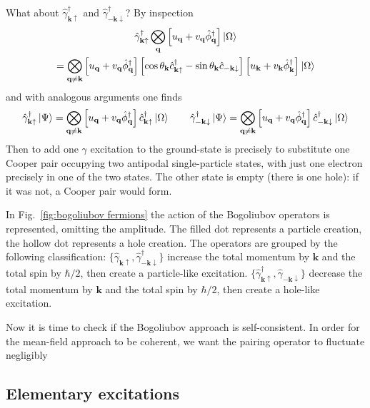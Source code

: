 What about $\hat{\gamma}_{\mathbf{k}\uparrow}^\dagger$ and $\hat{\gamma}_{-\mathbf{k}\downarrow}^\dagger$? By inspection
\begin{multline*}
	\hat{\gamma}_{\mathbf{k}\uparrow}^\dagger \bigotimes_\mathbf{q} \left[{u_\mathbf{q} + v_\mathbf{q} \hat{\phi}_\mathbf{q}^\dagger}\right] \ket{\Omega} \\ = \bigotimes_{\mathbf{q}\neq\mathbf{k}} \left[{u_\mathbf{q} + v_\mathbf{q} \hat{\phi}_\mathbf{q}^\dagger}\right] \left[{\cos\theta_\mathbf{k} \hat{c}_{\mathbf{k}\uparrow}^\dagger - \sin\theta_\mathbf{k} \hat{c}_{-\mathbf{k}\downarrow}}\right] \left[{u_\mathbf{k} + v_\mathbf{k} \hat{\phi}_\mathbf{k}^\dagger}\right] \ket{\Omega}
\end{multline*}
and with analogous arguments one finds
\[
	\hat{\gamma}_{\mathbf{k}\uparrow}^\dagger \ket{\Psi} = \bigotimes_{\mathbf{q}\neq\mathbf{k}} \left[{u_\mathbf{q} + v_\mathbf{q} \hat{\phi}_\mathbf{q}^\dagger}\right] \hat{c}_{\mathbf{k}\uparrow}^\dagger \ket{\Omega}
	\qquad
	\hat{\gamma}_{-\mathbf{k}\downarrow}^\dagger \ket{\Psi} = \bigotimes_{\mathbf{q}\neq\mathbf{k}} \left[{u_\mathbf{q} + v_\mathbf{q} \hat{\phi}_\mathbf{q}^\dagger}\right] \hat{c}_{-\mathbf{k}\downarrow}^\dagger \ket{\Omega}
\]
Then to add one $\gamma$ excitation to the ground-state is precisely to substitute one Cooper pair occupying two antipodal single-particle states, with just one electron precisely in one of the two states. The other state is empty (there is one hole): if it was not, a Cooper pair would form.

In Fig.~\ref{fig:bogoliubov fermions} the action of the Bogoliubov operators is represented, omitting the amplitude. The filled dot represents a particle creation, the hollow dot represents a hole creation. The operators are grouped by the following classification: $\lbrace \hat{\gamma}_{\mathbf{k}\uparrow}, \hat{\gamma}_{-\mathbf{k}\downarrow}^\dagger \rbrace$ increase the total momentum by $\mathbf{k}$ and the total spin by $\hbar/2$, then create a particle-like excitation. $\lbrace \hat{\gamma}_{\mathbf{k}\uparrow}^\dagger, \hat{\gamma}_{-\mathbf{k}\downarrow} \rbrace$ decrease the total momentum by $\mathbf{k}$ and the total spin by $\hbar/2$, then create a hole-like excitation. 

Now it is time to check if the Bogoliubov approach is self-consistent. In order for the mean-field approach to be coherent, we want the pairing operator to fluctuate negligibly 

\subsection{Elementary excitations}\label{subsec:elementary excitations}

